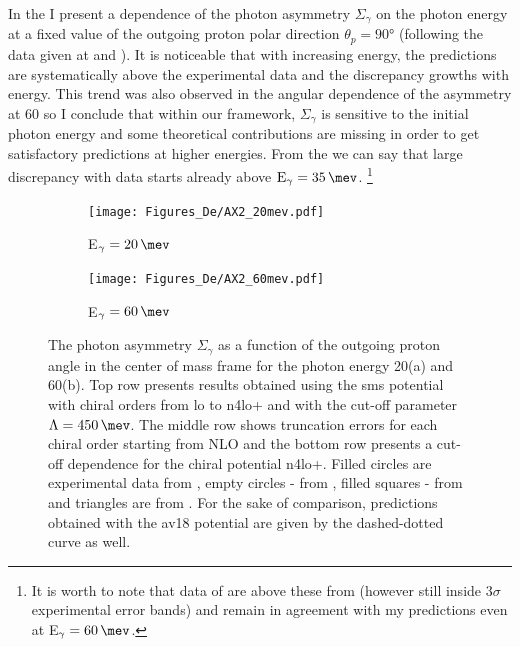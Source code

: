      In the  I present a dependence of the photon asymmetry
     $\Sigma_\gamma$ on the photon energy at a fixed value
     of the outgoing proton polar direction $\theta_p = \ang{90}$ 
     (following the data given at \cite{delbianco_1981} and \cite{depascale_asymmetry}).
     It is noticeable that with increasing energy, the predictions
     are systematically above the experimental data and the discrepancy growths with energy.
     This trend
     was also observed in the angular dependence of the asymmetry at \SI{60}{\mev}
     so I conclude that within our framework, 
     $\Sigma_\gamma$ is sensitive to the initial photon energy and some theoretical
     contributions are missing in order to get satisfactory predictions
     at higher energies. From the  we can say that
     large discrepancy with data starts already above $\text{E}_\gamma = \SI{35}{\mev}$.
     \footnote{It is worth to note that data of \cite{depascale_asymmetry} are
     above these from \cite{delbianco_1981} (however still inside $3\sigma$ experimental
     error bands) and remain in agreement with my predictions even at E$_\gamma=\SI{60}{\mev}$.}

    \begin{figure}[h]
        \centering
        \begin{subfigure}[b]{0.46\textwidth}
            \caption{\small E$_\gamma = \SI{20}{\mev}$}
            \texttt{[image: Figures\_De/AX2\_20mev.pdf]}
            \label{AX_20_vert}
        \end{subfigure}
        \begin{subfigure}[b]{0.46\textwidth}
            \caption{\small E$_\gamma = \SI{60}{\mev}$}
            \texttt{[image: Figures\_De/AX2\_60mev.pdf]}
            \label{AX_60_vert}
        \end{subfigure}
        \caption{The photon asymmetry $\Sigma_\gamma$ 
        as a function of the outgoing proton angle in the center of mass frame 
        for the photon energy \SI{20}{\mev}(a) and \SI{60}{\mev}(b).
        Top row presents results obtained using the \gls{sms} potential
        with chiral orders from \gls{lo} to \gls{n4lo+} and with the cut-off parameter $\Lambda=\SI{450}{\mev}$.
        The middle row shows truncation errors for each 
        chiral order starting from NLO and the
        bottom row presents a cut-off dependence for the chiral potential \gls{n4lo+}.
        Filled circles are experimental data from \cite{KRAUSE1992_asymetry},
        empty circles - from \cite{depascale_asymmetry}, filled squares
        - from \cite{Barannik_asymetry} and triangles are from \cite{Vnukov_asymmetry}.
        For the sake of comparison, predictions obtained with the \gls{av18} potential are
        given by the dashed-dotted curve as well.}
        \label{assymetry}
    \end{figure}
     
